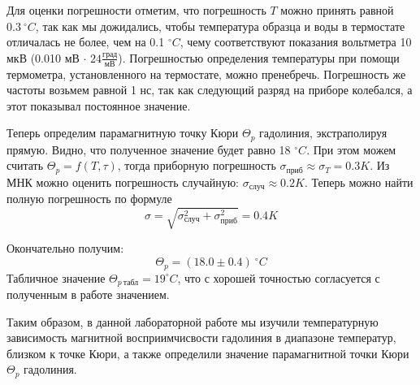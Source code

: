 \documentclass[14pt]{article}
\begin{document}
\vspace{0.5cm}

Для оценки погрешности отметим, что погрешность $T$ можно принять равной $0.3~^\circ C$, так как мы дожидались, чтобы температура образца и воды в термостате отличалась не более, чем на 0.1 $^\circ C$, чему соответствуют показания вольтметра 10 мкВ (0.010 мВ $\cdot$ $24\frac{\text{град}}{\text{мВ}}$). Погрешностью определения температуры при помощи термометра, установленного на термостате, можно пренебречь. Погрешность же частоты возьмем равной 1 нс, так как следующий разряд на приборе колебался, а этот показывал постоянное значение.

Теперь определим парамагнитную точку Кюри $\Theta_p$ гадолиния, экстраполируя прямую. Видно, что полученное значение будет равно 18 $^\circ C$. При этом можем считать 
$\Theta_p = f(T, \tau)$, тогда приборную погрешность $\sigma_{\text{приб}} \approx \sigma_T = 0.3 K$. Из МНК можно оценить погрешность случайную: 
$\sigma_{\text{случ}} \approx 0.2 K$. Теперь можно найти полную погрешность по формуле
$$
	\sigma = \sqrt{\sigma_{\text{случ}}^2 + \sigma_{\text{приб}}^2} = 0.4 K
$$

Окончательно получим:
$$
	\boxed{\Theta_p = (18.0 \pm 0.4)~^\circ C}
$$
Табличное значение $\Theta_{p~\text{табл}} = 19 ^\circ C$, что с хорошей точностью согласуется с полученным в работе значением.

\vspace{1cm}
Таким образом, в данной лабораторной работе мы изучили температурную зависимость магнитной восприимчисвости гадолиния в диапазоне температур, близком к точке Кюри, а также определили значение парамагнитной точки Кюри $\Theta_p$ гадолиния. 
\end{document}
